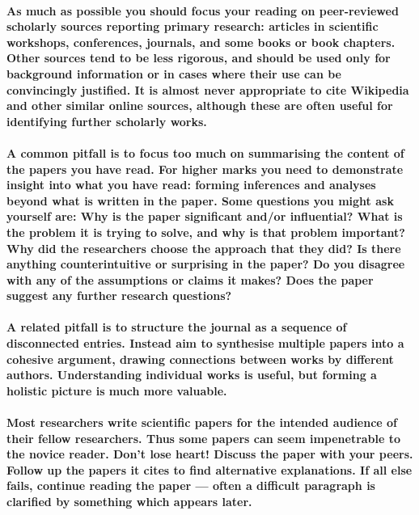 \documentclass{../../fal_assignment}
\begin{document}
\paragraph{
As much as possible you should focus your reading on peer-reviewed scholarly sources reporting primary research:
articles in scientific workshops, conferences, journals, and some books or book chapters.
Other sources tend to be less rigorous, and should be used only for background information
or in cases where their use can be convincingly justified.
It is almost never appropriate to cite Wikipedia and other similar online sources,
although these are often useful for identifying further scholarly works.
}

\paragraph{
A common pitfall is to focus too much on summarising the content of the papers you have read.
For higher marks you need to demonstrate \textbf{insight} into what you have read:
forming inferences and analyses beyond what is written in the paper.
Some questions you might ask yourself are:
Why is the paper significant and/or influential?
What is the problem it is trying to solve, and why is that problem important?
Why did the researchers choose the approach that they did?
Is there anything counterintuitive or surprising in the paper?
Do you disagree with any of the assumptions or claims it makes?
Does the paper suggest any further research questions?
}

\paragraph{
A related pitfall is to structure the journal as a sequence of disconnected entries.
Instead aim to \textbf{synthesise} multiple papers into a cohesive argument,
drawing connections between works by different authors.
Understanding individual works is useful, but forming a holistic picture is much more valuable.
}

\paragraph{
Most researchers write scientific papers for the intended audience of their fellow researchers.
Thus some papers can seem impenetrable to the novice reader.
Don't lose heart!
Discuss the paper with your peers.
Follow up the papers it cites to find alternative explanations.
If all else fails, continue reading the paper --- often a difficult paragraph is clarified by something which appears later.
}
\end{document}
